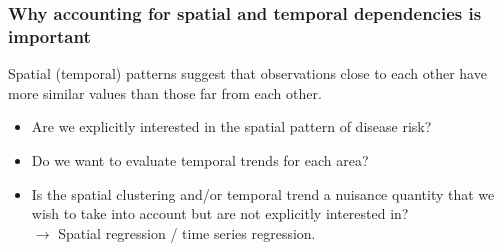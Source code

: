 \documentclass[slidestop,compress,serif,10pt]{beamer}
\begin{document}
\begin{frame}
\frametitle{Why accounting for spatial and temporal dependencies is important}
	Spatial (temporal) patterns suggest that observations close to each other have more similar
	values than those far from each other.
\begin{itemize}
\vspace{20pt}\item[] Are we explicitly interested in the spatial pattern of disease risk?\\
\item[] Do we want to evaluate temporal trends for each area?\\
\end{itemize}
\pause{}

\begin{itemize}
\pause\vspace{20pt}\item[] Is the spatial clustering and/or temporal trend a nuisance quantity that we wish to take into account but are not explicitly interested in?\\ 
$\rightarrow$ Spatial regression / time series regression.\\
\end{itemize} 
\pause{}
\end{frame}
\end{document}
